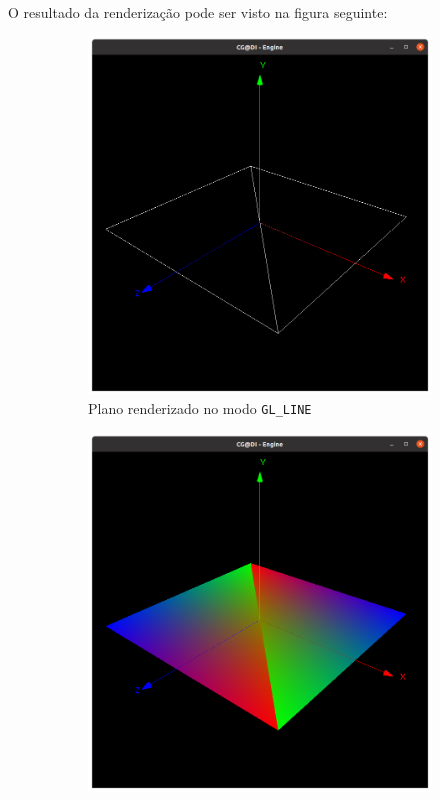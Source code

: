 \documentclass[a4paper, 11pt]{article}
\begin{document}
\ \\

O resultado da renderização pode ser visto na figura seguinte:

\begin{figure}[H]
\centering
\begin{subfigure}{.5\textwidth}
    \centering
    \includegraphics[width=\textwidth]{img/plano_linhas.png}
    \caption{Plano renderizado no modo \texttt{GL\_LINE}}
\end{subfigure}%
\begin{subfigure}{.5\textwidth}
    \centering
    \includegraphics[width=\textwidth]{img/plano_preenchido.png}

\end{subfigure}
\end{figure}
\end{document}
